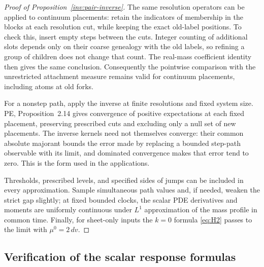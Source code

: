 \begin{proof}[Proof of Proposition~\ref{inv:pair-inverse}]
The same resolution operators can be applied to continuum placements:
retain the indicators of membership in the blocks at each resolution
cut, while keeping the exact old-label positions. To check this, insert
empty steps between the cuts. Integer counting of additional slots
depends only on their coarse genealogy with the old labels, so refining
a group of children does not change that count. The real-mass
coefficient identity then gives the same conclusion. Consequently the
pointwise comparison with the unrestricted attachment measure remains
valid for continuum placements, including atoms at old forks.

For a nonstep path, apply the inverse at finite resolutions and fixed
system size. PE, Proposition~2.14 gives convergence of positive
expectations at each fixed placement, preserving prescribed cuts and
excluding only a null set of new placements. The inverse kernels need
not themselves converge: their common absolute majorant bounds the
error made by replacing a bounded step-path observable with its limit,
and dominated convergence makes that error tend to zero. This is the
form used in the applications.

Thresholds, prescribed levels, and specified sides of jumps can be
included in every approximation. Sample simultaneous path values and,
if needed, weaken the strict gap slightly; at fixed bounded clocks,
the scalar PDE derivatives and moments are uniformly continuous under
\(L^1\) approximation of the mass profile in common time. Finally,
for sheet-only inputs the \(k=0\) formula \eqref{eq:H2} passes to the
limit with \(\mu^0=2\,dv\).
\end{proof}

\subsection{Verification of the scalar response formulas}

